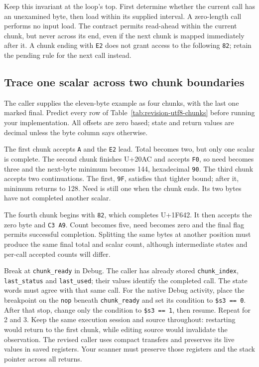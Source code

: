 Keep this invariant at the loop's top. First determine whether the current call
has an unexamined byte, then load within its supplied interval. A zero-length
call performs no input load. The contract permits read-ahead within the current
chunk, but never across its end, even if the next chunk is mapped immediately
after it. A chunk ending with \texttt{E2} does not grant access to the following
\texttt{82}; retain the pending rule for the next call instead.

\subsection*{Trace one scalar across two chunk boundaries}

The caller supplies the eleven-byte example as four chunks, with the last one
marked final. Predict every row of Table~\ref{tab:revision-utf8-chunks} before
running your implementation. All offsets are zero based; state and return values
are decimal unless the byte column says otherwise.



The first chunk accepts \texttt{A} and the \texttt{E2} lead. Total becomes two,
but only one scalar is complete. The second chunk finishes U+20AC and accepts
\texttt{F0}, so need becomes three and the next-byte minimum becomes 144,
hexadecimal \texttt{90}. The third chunk accepts two continuations. The first,
\texttt{9F}, satisfies that tighter bound; after it, minimum returns to 128.
Need is still one when the chunk ends. Its two bytes have not completed another
scalar.

The fourth chunk begins with \texttt{82}, which completes U+1F642. It then accepts
the zero byte and \texttt{C3 A9}. Count becomes five, need becomes zero and the
final flag permits successful completion. Splitting the same bytes at another
position must produce the same final total and scalar count, although intermediate
states and per-call accepted counts will differ.

Break at \texttt{chunk\_ready} in Debug. The caller has already stored
\texttt{chunk\_index}, \texttt{last\_status} and \texttt{last\_used}; their values
identify the completed call. The state words must agree with that same call.
For the native Debug activity, place the breakpoint on the \texttt{nop} beneath
\texttt{chunk\_ready} and set its condition to \texttt{\$s3 == 0}. After that
stop, change only the condition to \texttt{\$s3 == 1}, then resume. Repeat for
2 and 3. Keep the same execution session and source throughout: restarting would
return to the first chunk, while editing source would invalidate the observation. The revised caller uses
compact transfers and preserves its live values in saved registers. Your scanner
must preserve those registers and the stack pointer across all returns.

